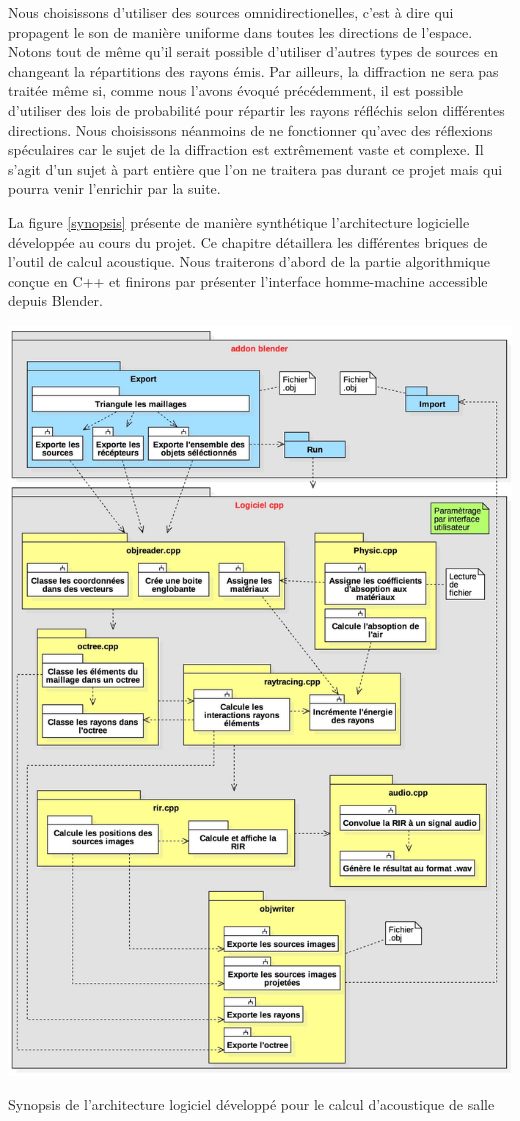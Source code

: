 Nous choisissons d'utiliser des sources omnidirectionelles, c'est à dire qui propagent le son de manière uniforme dans toutes les directions de l'espace. Notons tout de même qu'il serait possible d'utiliser d'autres types de sources en changeant la répartitions des rayons émis. Par ailleurs, la diffraction ne sera pas traitée même si, comme nous l'avons évoqué précédemment, il est possible d'utiliser des lois de probabilité pour répartir les rayons réfléchis selon différentes directions. Nous choisissons néanmoins de ne fonctionner qu'avec des réflexions spéculaires car le sujet de la diffraction est extrêmement vaste et complexe. Il s'agit d'un sujet à part entière que l'on ne traitera pas durant ce projet mais qui pourra venir l'enrichir par la suite.

La figure \ref{synopsis} présente de manière synthétique l'architecture logicielle développée au cours du projet. Ce chapitre détaillera les différentes briques de l'outil de calcul acoustique. Nous traiterons d'abord de la partie algorithmique conçue en C++ et finirons par présenter l'interface homme-machine accessible depuis Blender.

\begin{figureth}
	\includegraphics[width=\linewidth]{images/synopsis}
	\caption{Synopsis de l'architecture logiciel développé pour le calcul d'acoustique de salle}
	\label{synopsis}
\end{figureth}


